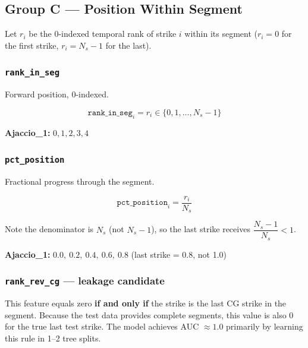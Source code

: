 \documentclass[12pt,a4paper]{article}
\newcommand{\feat}[1]{\texttt{\textbf{#1}}}
\begin{document}
\subsection{Group C --- Position Within Segment}

Let $r_i$ be the 0-indexed temporal rank of strike $i$ within its segment ($r_i = 0$ for the first strike, $r_i = N_s - 1$ for the last).

\subsubsection*{\feat{rank\_in\_seg}}

Forward position, 0-indexed.

\begin{formulabox}
\[
  \texttt{rank\_in\_seg}_i = r_i \in \{0, 1, \ldots, N_s - 1\}
\]
\end{formulabox}

\textbf{Ajaccio\_1:} $0, 1, 2, 3, 4$

\subsubsection*{\feat{pct\_position}}

Fractional progress through the segment.

\begin{formulabox}
\[
  \texttt{pct\_position}_i = \frac{r_i}{N_s}
\]
\end{formulabox}

Note the denominator is $N_s$ (not $N_s - 1$), so the last strike receives $\dfrac{N_s - 1}{N_s} < 1$.

\textbf{Ajaccio\_1:} $0.0,\ 0.2,\ 0.4,\ 0.6,\ \mathbf{0.8}$ \quad (last strike = 0.8, not 1.0)

\subsubsection*{\feat{rank\_rev\_cg} \quad \textnormal{\textcolor{warningcolor}{--- leakage candidate}}}

\begin{warningbox}
This feature equals zero \textbf{if and only if} the strike is the last CG strike in the segment. Because the test data provides complete segments, this value is also 0 for the true last test strike. The model achieves AUC $\approx 1.0$ primarily by learning this rule in 1--2 tree splits.
\end{warningbox}
\end{document}
